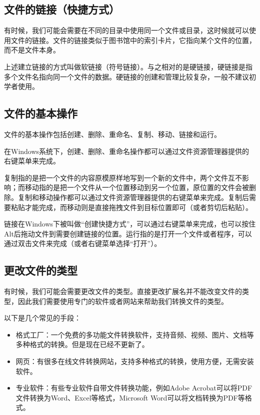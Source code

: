 \subsection{文件的链接（快捷方式）}

有时候，我们可能会需要在不同的目录中使用同一个文件或目录，这时候就可以使用文件的链接。文件的链接类似于图书馆中的索引卡片，它指向某个文件的位置，而不是文件本身。

上述建立链接的方式叫做软链接（符号链接）。与之相对的是硬链接，硬链接是指多个文件名指向同一个文件的数据。硬链接的创建和管理比较复杂，一般不建议初学者使用。

\subsection{文件的基本操作}

文件的基本操作包括创建、删除、重命名、复制、移动、链接和运行。

在Windows系统下，创建、删除、重命名操作都可以通过文件资源管理器提供的右键菜单来完成。

复制指的是把一个文件的内容原模原样地写到一个新的文件中，两个文件互不影响；而移动指的是把一个文件从一个位置移动到另一个位置，原位置的文件会被删除。复制和移动操作都可以通过文件资源管理器提供的右键菜单来完成。复制后需要粘贴才能完成，而移动则是直接拖拽文件到目标位置即可（或者剪切后粘贴）。

链接在Windows下被叫做“创建快捷方式”，可以通过右键菜单来完成，也可以按住Alt后拖动文件到需要创建链接的位置。运行指的是打开一个文件或者程序，可以通过双击文件来完成（或者右键菜单选择“打开”）。

\subsection{更改文件的类型}

有时候，我们可能会需要更改文件的类型。直接更改扩展名并不能改变文件的类型，因此我们需要使用专门的软件或者网站来帮助我们转换文件的类型。

以下是几个常见的手段：
\begin{itemize}
  \item 格式工厂：一个免费的多功能文件转换软件，支持音频、视频、图片、文档等多种格式的转换。但是现在已经不更新了。
  \item 网页：有很多在线文件转换网站，支持多种格式的转换，使用方便，无需安装软件。
  \item 专业软件：有些专业软件自带文件转换功能，例如Adobe Acrobat可以将PDF文件转换为Word、Excel等格式，Microsoft Word可以将文档转换为PDF等格式。
\end{itemize}

